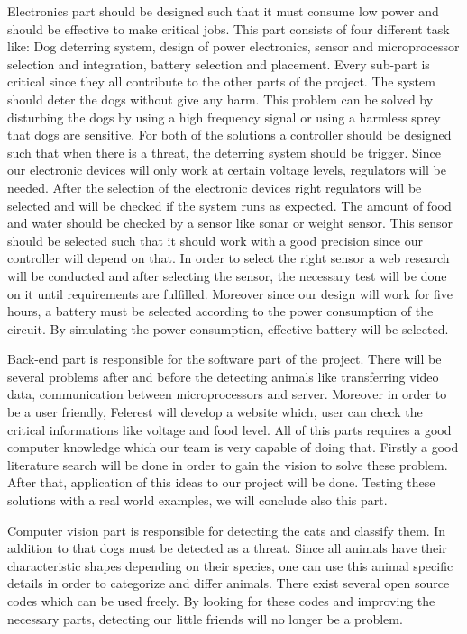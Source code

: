 Electronics part should be designed such that it must consume low power and should be effective to make critical jobs. This part consists of four different task like: Dog deterring system, design of power electronics, sensor and microprocessor selection and integration, battery selection and placement. Every sub-part is critical since they all contribute to the other parts of the project. The system should deter the dogs without give any harm. This problem can be solved by disturbing the dogs by using a high frequency signal \cite{cite:Dogrepellingdetterent} or using a harmless sprey \cite{cite:Dogrepellingsprey}  that dogs are sensitive. For both of the solutions a controller should be designed such that when there is a threat, the deterring system should be trigger. Since our electronic devices will only work at certain voltage levels, regulators will be needed. After the selection of the electronic devices right regulators will be selected and will be checked if the system runs as expected.  The amount of food and water should be checked by a sensor like sonar or weight sensor. This sensor should be selected such that it should work with a good precision since our controller will depend on that. In order to select the right sensor a web research will be conducted and after selecting the sensor, the necessary test will be done on it until requirements are fulfilled.
Moreover since our design will work for five hours, a battery must be selected according to the power consumption of the circuit. By simulating the power consumption, effective battery will be selected.

Back-end part is responsible for the software part of the project. There will be several problems after and before the detecting animals like transferring video data, communication between microprocessors and server. Moreover in order to be a user friendly, Felerest will develop a website which, user can check the critical informations like voltage and food level. All of this parts requires a good computer knowledge which our team is very capable of doing that. Firstly a good literature search will be done in order to gain the vision to solve these problem. After that, application of this ideas to our project will be done. Testing these solutions with a real world examples, we will conclude also this part.

Computer vision part is responsible for detecting the cats and classify them. In addition to that dogs must be detected as a threat. Since all animals have their characteristic shapes depending on their species, one can use this animal specific details in order to categorize and differ animals. There exist several open source codes which can be used freely. By looking for these codes and improving the necessary parts, detecting our little friends will no longer be a problem.

